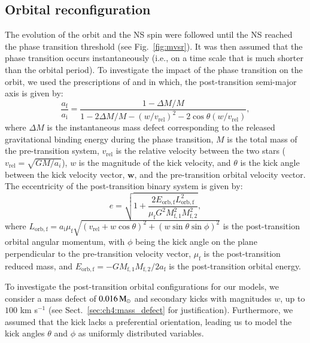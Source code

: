\documentclass[main.tex]{subfiles}
\begin{document}
    
    
    \subsection{Orbital reconfiguration}\label{sec:ch4:orb_reconfig}
    The evolution of the orbit and the NS spin were followed until the NS reached the phase transition threshold (see Fig.~\ref{fig:mvsr}). It was then assumed that the phase transition occurs instantaneously (i.e., on a time scale that is much shorter than the orbital period). To investigate the impact of the phase transition on the orbit, we used the prescriptions of \cite{1983apj:Hills} and \cite{Tauris:2017apj} in which, the post-transition semi-major axis is given by:
    \begin{equation}
        \label{eq:major_axis_posttrans}
        \frac{a_\mathrm{f}}{a_\mathrm{i}} = \frac{1 - \Delta M/M}{1 - 2\Delta M/M - (w/v_\mathrm{rel})^2 - 2\cos\theta(w/v_\mathrm{rel})},
    \end{equation}
    where $\Delta M$ is the instantaneous mass defect  corresponding to the released gravitational binding energy during the phase transition, $M$ is the total mass of the pre-transition system, $v_\mathrm{rel}$ is the relative velocity between the two stars ($v_\mathrm{rel} = \sqrt{GM/a_i}$), $w$ is the magnitude of the kick velocity, and $\theta$ is the kick angle between the kick velocity vector, $\textbf{w}$, and the pre-transition orbital velocity vector.
    The eccentricity of the post-transition binary system is given by:
    \begin{equation}
        \label{eq:eccentricity_posttrans}
        e = \sqrt{1 + \frac{2E_\mathrm{orb,f}L_\mathrm{orb,f}^2}{\mu_\mathrm{f} G^2 M_\mathrm{f,1}^2 M_\mathrm{f,2}^2}},
    \end{equation}
    where $L_\mathrm{orb,f} = a_\mathrm{i} \mu_\mathrm{f} \sqrt{(v_\mathrm{rel} + w\cos\theta)^2 + (w\sin\theta \sin\phi)^2}$ is the post-transition orbital angular momentum, with $\phi$ being the kick angle on the plane perpendicular to the pre-transition velocity vector, $\mu_\mathrm{f}$ is the post-transition reduced mass, and $E_\mathrm{orb,f} = -GM_\mathrm{f,1}M_\mathrm{f,2}/2a_\mathrm{f}$ is the post-transition orbital energy. 
    
    To investigate the post-transition orbital configurations for our models, we consider a mass defect of $0.016\mathrm{\,M_\odot}$ and secondary kicks with  magnitudes $w$, up to $100$ km s$^{-1}$ (see Sect.~\ref{sec:ch4:mass_defect} for justification). Furthermore, we assumed that the kick lacks a preferential orientation, leading us to model the kick angles $\theta$ and $\phi$ as uniformly distributed variables. 
    
\end{document}
